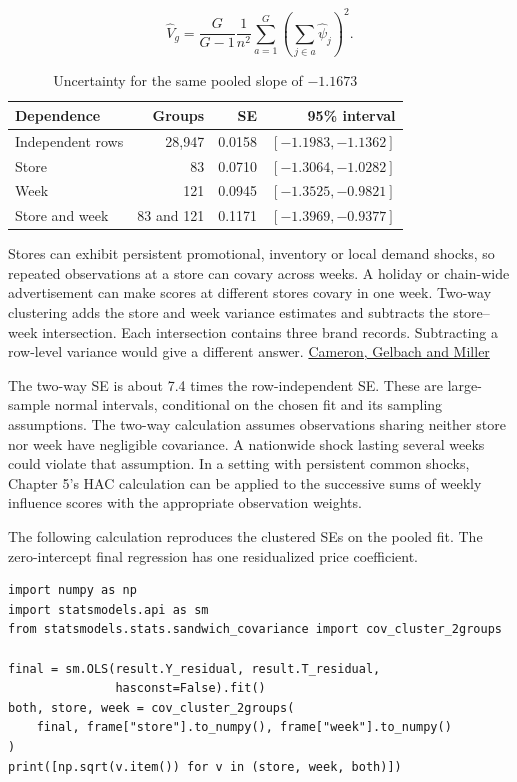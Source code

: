 \[
\hat V_{g} = \frac{G}{G-1}\frac{1}{n^2}
    \sum_{a=1}^{G}\left(\sum_{j \in a}\hat\psi_j\right)^2.
\]

\begin{table}[htbp]
\centering
\caption{Uncertainty for the same pooled slope of $-1.1673$}
\label{tab:oj_score_se}
\small
\setlength{\tabcolsep}{3pt}
\begin{tabular}{@{}lrrr@{}}
\toprule
Dependence & Groups & SE & 95\% interval \\
\midrule
Independent rows & 28,947 & 0.0158 & $[-1.1983, -1.1362]$ \\
Store & 83 & 0.0710 & $[-1.3064, -1.0282]$ \\
Week & 121 & 0.0945 & $[-1.3525, -0.9821]$ \\
Store and week & 83 and 121 & 0.1171 & $[-1.3969, -0.9377]$ \\
\bottomrule
\end{tabular}
\end{table}

Stores can exhibit persistent promotional, inventory or local demand shocks, so repeated observations at a store can covary across weeks. A holiday or chain-wide advertisement can make scores at different stores covary in one week. Two-way clustering adds the store and week variance estimates and subtracts the store--week intersection. Each intersection contains three brand records. Subtracting a row-level variance would give a different answer. \href{https://doi.org/10.1198/jbes.2010.07136}{Cameron, Gelbach and Miller}

The two-way SE is about 7.4 times the row-independent SE. These are large-sample normal intervals, conditional on the chosen fit and its sampling assumptions. The two-way calculation assumes observations sharing neither store nor week have negligible covariance. A nationwide shock lasting several weeks could violate that assumption. In a setting with persistent common shocks, Chapter 5's HAC calculation can be applied to the successive sums of weekly influence scores with the appropriate observation weights.

The following calculation reproduces the clustered SEs on the pooled fit. The zero-intercept final regression has one residualized price coefficient.

\begin{verbatim}
import numpy as np
import statsmodels.api as sm
from statsmodels.stats.sandwich_covariance import cov_cluster_2groups

final = sm.OLS(result.Y_residual, result.T_residual,
               hasconst=False).fit()
both, store, week = cov_cluster_2groups(
    final, frame["store"].to_numpy(), frame["week"].to_numpy()
)
print([np.sqrt(v.item()) for v in (store, week, both)])
\end{verbatim}

